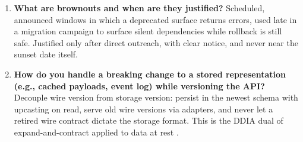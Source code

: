 \begin{enumerate}[label=\textbf{Q\arabic*.}, leftmargin=1.6cm, start=21]
        scale, so timelines stretch to quarters/years, communication needs
        full campaign machinery, and brownouts replace direct outreach for
        the long tail.
  \item \textbf{What are brownouts and when are they justified?}
        Scheduled, announced windows in which a deprecated surface returns
        errors, used late in a migration campaign to surface silent
        dependencies while rollback is still safe. Justified only after
        direct outreach, with clear notice, and never near the sunset date
        itself.
  \item \textbf{How do you handle a breaking change to a stored representation
        (e.g., cached payloads, event log) while versioning the API?}
        Decouple wire version from storage version: persist in the newest
        schema with upcasting on read, serve old wire versions via adapters,
        and never let a retired wire contract dictate the storage format.
        This is the DDIA dual of expand-and-contract applied to data at rest
        \cite{kleppmann2017ddia}.
\end{enumerate}

